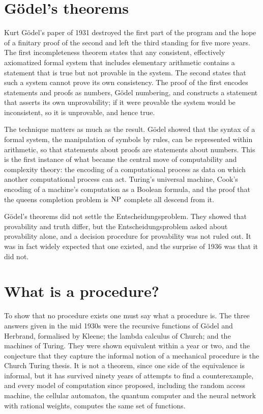 \section{G\"odel's theorems}

Kurt G\"odel's paper of 1931 destroyed the first part of the program and the hope of a finitary proof of the second and left the third standing for five more years. The first incompleteness theorem states that any consistent, effectively axiomatized formal system that includes elementary arithmetic contains a statement that is true but not provable in the system. The second states that such a system cannot prove its own consistency. The proof of the first encodes statements and proofs as numbers, G\"odel numbering, and constructs a statement that asserts its own unprovability; if it were provable the system would be inconsistent, so it is unprovable, and hence true.

The technique matters as much as the result. G\"odel showed that the syntax of a formal system, the manipulation of symbols by rules, can be represented within arithmetic, so that statements about proofs are statements about numbers. This is the first instance of what became the central move of computability and complexity theory: the encoding of a computational process as data on which another computational process can act. Turing's universal machine, Cook's encoding of a machine's computation as a Boolean formula, and the proof that the queens completion problem is $\mathrm{NP}$ complete all descend from it.

G\"odel's theorems did not settle the Entscheidungsproblem. They showed that provability and truth differ, but the Entscheidungsproblem asked about provability alone, and a decision procedure for provability was not ruled out. It was in fact widely expected that one existed, and the surprise of 1936 was that it did not.

\section{What is a procedure?}

To show that no procedure exists one must say what a procedure is. The three answers given in the mid 1930s were the recursive functions of G\"odel and Herbrand, formalised by Kleene; the lambda calculus of Church; and the machines of Turing. They were shown equivalent within a year or two, and the conjecture that they capture the informal notion of a mechanical procedure is the Church Turing thesis. It is not a theorem, since one side of the equivalence is informal, but it has survived ninety years of attempts to find a counterexample, and every model of computation since proposed, including the random access machine, the cellular automaton, the quantum computer and the neural network with rational weights, computes the same set of functions.

